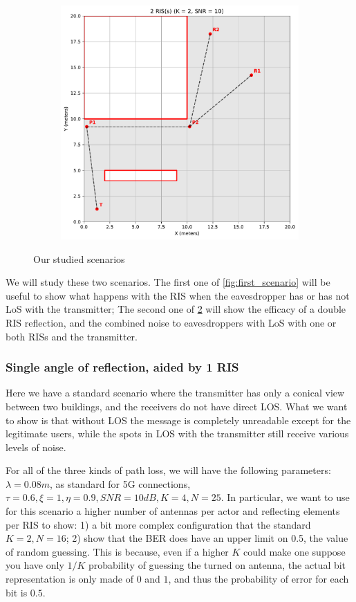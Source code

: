 \begin{figure}[H]
\begin{subfigure}[b]{0.48\textwidth}
    \includegraphics[width=\textwidth]{imgs/heatmap-simulations/2 RIS(s) (K = 2, SNR = 10).pdf}
    \label{fig:second_scenario}
  \end{subfigure}
  \caption{Our studied scenarios}
\end{figure}

We will study these two scenarios. The first one of \cref{fig:first_scenario} will be useful to show what happens with the RIS when the eavesdropper has or has not LoS with the transmitter; The second one of \cref{fig:second_scenario} will show the efficacy of a double RIS reflection, and the combined noise to eavesdroppers with LoS with one or both RISs and the transmitter.

\subsubsection{Single angle of reflection, aided by 1 RIS}

Here we have a standard scenario where the transmitter has only a conical view between two buildings, and the receivers do not have direct LOS. What we want to show is that without LOS the message is completely unreadable except for the legitimate users, while the spots in LOS with the transmitter still receive various levels of noise.

For all of the three kinds of path loss, we will have the following parameters: $\lambda = 0.08m$, as standard for 5G connections, $ \tau = 0.6, \xi = 1, \eta = 0.9, SNR = 10dB, K = 4, N = 25$. In particular, we want to use for this scenario a higher number of antennas per actor and reflecting elements per RIS to show: 1) a bit more complex configuration that the standard $K = 2, N = 16$; 2) show that the BER does have an upper limit on 0.5, the value of random guessing. This is because, even if a higher $K$ could make one suppose you have only $1/K$ probability of guessing the turned on antenna, the actual bit representation is only made of $0$ and $1$, and thus the probability of error for each bit is $0.5$.

